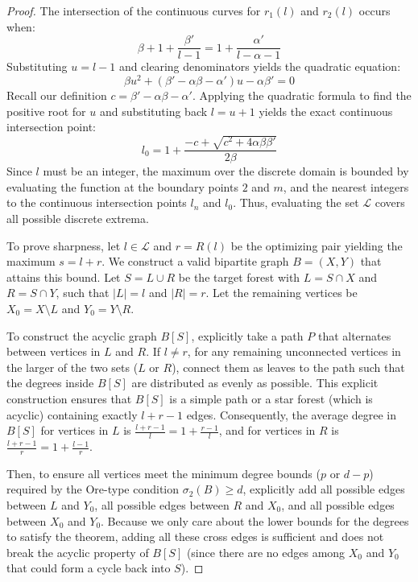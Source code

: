 \documentclass[a4paper]{amsart}
\begin{document}
\begin{proof}
The intersection of the continuous curves for $r_1(l)$ and $r_2(l)$ occurs when:
\[ \beta + 1 + \frac{\beta'}{l-1} = 1 + \frac{\alpha'}{l - \alpha - 1} \]
Substituting $u = l-1$ and clearing denominators yields the quadratic equation:
\[ \beta u^2 + (\beta' - \alpha \beta - \alpha')u - \alpha \beta' = 0 \]
Recall our definition $c = \beta' - \alpha \beta - \alpha'$. Applying the quadratic formula to find the positive root for $u$ and substituting back $l = u + 1$ yields the exact continuous intersection point:
\[ l_0 = 1 + \frac{-c + \sqrt{c^2 + 4 \alpha \beta \beta'}}{2\beta} \]
Since $l$ must be an integer, the maximum over the discrete domain is bounded by evaluating the function at the boundary points $2$ and $m$, and the nearest integers to the continuous intersection points $l_n$ and $l_0$. Thus, evaluating the set $\mathcal{L}$ covers all possible discrete extrema.

To prove sharpness, let $l \in \mathcal{L}$ and $r = R(l)$ be the optimizing pair yielding the maximum $s = l+r$.
We construct a valid bipartite graph $B = (X, Y)$ that attains this bound.
Let $S = L \cup R$ be the target forest with $L = S \cap X$ and $R = S \cap Y$, such that $|L| = l$ and $|R| = r$. 
Let the remaining vertices be $X_0 = X \setminus L$ and $Y_0 = Y \setminus R$.

To construct the acyclic graph $B[S]$, explicitly take a path $P$ that alternates between vertices in $L$ and $R$. 
If $l \ne r$, for any remaining unconnected vertices in the larger of the two sets ($L$ or $R$), connect them as leaves to the path such that the degrees inside $B[S]$ are distributed as evenly as possible. 
This explicit construction ensures that $B[S]$ is a simple path or a star forest (which is acyclic) containing exactly $l+r-1$ edges. 
Consequently, the average degree in $B[S]$ for vertices in $L$ is $\frac{l+r-1}{l} = 1 + \frac{r-1}{l}$, and for vertices in $R$ is $\frac{l+r-1}{r} = 1 + \frac{l-1}{r}$. 

Then, to ensure all vertices meet the minimum degree bounds ($p$ or $d-p$) required by the Ore-type condition $\sigma_2(B) \ge d$, explicitly add all possible edges between $L$ and $Y_0$, all possible edges between $R$ and $X_0$, and all possible edges between $X_0$ and $Y_0$. 
Because we only care about the lower bounds for the degrees to satisfy the theorem, adding all these cross edges is sufficient and does not break the acyclic property of $B[S]$ (since there are no edges among $X_0$ and $Y_0$ that could form a cycle back into $S$).


\end{proof}
\end{document}
